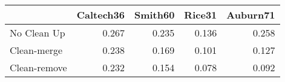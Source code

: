 \begin{tabular}{lrrrr}
\toprule
{} & Caltech36 & Smith60 & Rice31 & Auburn71 \\
\midrule
No Clean Up  &     0.267 &   0.235 &  0.136 &    0.258 \\
Clean-merge  &     0.238 &   0.169 &  0.101 &    0.127 \\
Clean-remove &     0.232 &   0.154 &  0.078 &    0.092 \\
\bottomrule
\end{tabular}
